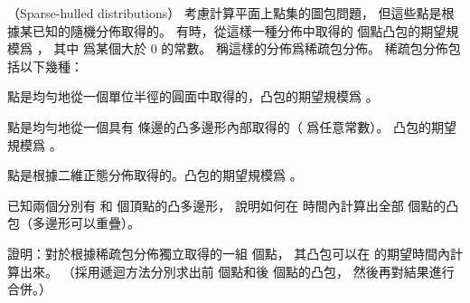 \startPROBLEM
（Sparse-hulled distributions）
考慮計算平面上點集的圖包問題，
但這些點是根據某已知的隨機分佈取得的。
有時，從這樣一種分佈中取得的  個點凸包的期望規模爲 ，
其中 \m{\varepsilon} 爲某個大於 0 的常數。
稱這樣的分佈爲{\EMP 稀疏包分佈}。
稀疏包分佈包括以下幾種：
\startigBase[2]
\item 點是均勻地從一個單位半徑的圓面中取得的，凸包的期望規模爲 。
\item 點是均勻地從一個具有  條邊的凸多邊形內部取得的（ 爲任意常數）。
凸包的期望規模爲 。
\item 點是根據二維正態分佈取得的。凸包的期望規模爲 。
\stopigBase

\startigBase[a]\startitem
已知兩個分別有  和  個頂點的凸多邊形，
說明如何在  時間內計算出全部  個點的凸包（多邊形可以重疊）。
\stopitem\stopigBase

\startANSWER
{}
\stopANSWER

\startigBase[continue]\startitem
證明：對於根據稀疏包分佈獨立取得的一組  個點，
其凸包可以在  的期望時間內計算出來。
（\hint 採用遞迴方法分別求出前  個點和後  個點的凸包，
然後再對結果進行合併。）
\stopitem\stopigBase

\startANSWER
{}
\stopANSWER
\stopPROBLEM

\stopsubject%
